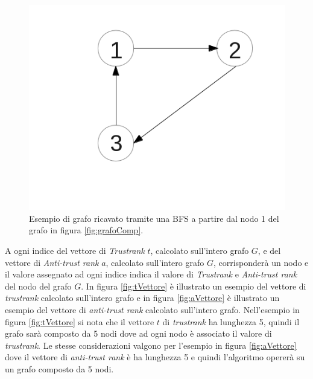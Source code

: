 \begin{figure}
\centering
 \includegraphics{immagini/test/grafo3}
 \caption{Esempio di grafo ricavato tramite una BFS a partire dal nodo 1 del grafo in figura \ref{fig:grafoComp}.}
 \label{fig:grafo3}
\end{figure}
A ogni indice del  vettore di \textit{Trustrank} \(t\), calcolato sull'intero grafo \(G\), e del vettore di \textit{Anti-trust rank} \(a\), calcolato sull'intero grafo \(G\), corrisponderà un nodo e il valore assegnato ad ogni  indice indica il valore di \textit{Trustrank} e \textit{Anti-trust rank} del nodo del grafo \(G\). In figura \ref{fig:tVettore} è illustrato un esempio del vettore di \textit{trustrank} calcolato sull'intero grafo e in figura \ref{fig:aVettore} è illustrato un esempio del vettore di \textit{anti-trust rank} calcolato sull'intero grafo. 
Nell'esempio in figura \ref{fig:tVettore} si nota che il vettore \(t\) di \textit{trustrank} ha lunghezza 5, quindi il grafo sarà composto da 5 nodi dove ad ogni nodo è associato il valore di \textit{trustrank}. Le stesse considerazioni valgono per l'esempio in figura \ref{fig:aVettore} dove il vettore di \textit{anti-trust rank} è ha lunghezza 5 e quindi l'algoritmo opererà su un grafo composto da 5 nodi.

